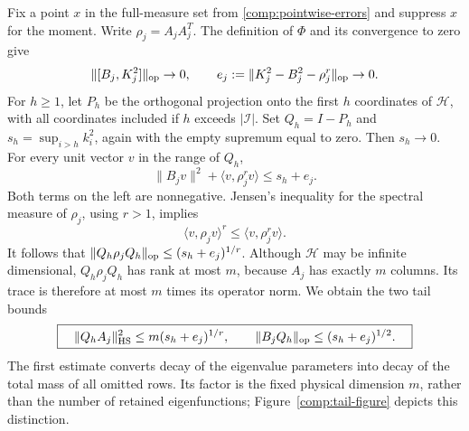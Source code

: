 Fix a point $x$ in the full-measure set from
\eqref{comp:pointwise-errors} and suppress $x$ for the moment.  Write
$\rho_j=A_jA_j^T$.  The definition of $\Phi$ and its convergence to zero
give
\begin{equation}
 \|[B_j,K_j^2]\|_{\operatorname{op}}\to0,
 \qquad e_j:=\|K_j^2-B_j^2-\rho_j^r\|_{\operatorname{op}}\to0.
 \label{comp:pointwise-algebra-error}
\end{equation}
For $h\geq1$, let $P_h$ be the orthogonal projection onto the first $h$
coordinates of $\mathscr H$, with all coordinates included if $h$ exceeds
$|\mathcal I|$.  Set $Q_h=I-P_h$ and
$s_h=\sup_{i>h}k_i^2$, again with the empty supremum equal to zero.
Then $s_h\to0$.  For every unit vector $v$ in the range of $Q_h$,
\begin{equation}
 \|B_jv\|^2+\langle v,\rho_j^rv\rangle\leq s_h+e_j.
 \label{comp:tail-quadratic}
\end{equation}
Both terms on the left are nonnegative.  Jensen's inequality for the
spectral measure of $\rho_j$, using $r>1$, implies
\[
 \langle v,\rho_jv\rangle^r\leq\langle v,\rho_j^rv\rangle.
\]
It follows that
$\|Q_h\rho_jQ_h\|_{\operatorname{op}}\leq(s_h+e_j)^{1/r}$.
Although $\mathscr H$ may be infinite dimensional, $Q_h\rho_jQ_h$
has rank at most $m$, because $A_j$ has exactly $m$ columns.  Its trace
is therefore at most $m$ times its operator norm.  We obtain the two
tail bounds
\begin{equation}
 \boxed{\quad
 \|Q_hA_j\|_{\mathrm{HS}}^2\leq m(s_h+e_j)^{1/r},
 \qquad
 \|B_jQ_h\|_{\operatorname{op}}\leq(s_h+e_j)^{1/2}.
 \quad}
 \label{comp:tail-bounds}
\end{equation}
The first estimate converts decay of the eigenvalue parameters into
decay of the total mass of all omitted rows.  Its factor is the fixed
physical dimension $m$, rather than the number of retained
eigenfunctions; Figure~\ref{comp:tail-figure} depicts this distinction.

